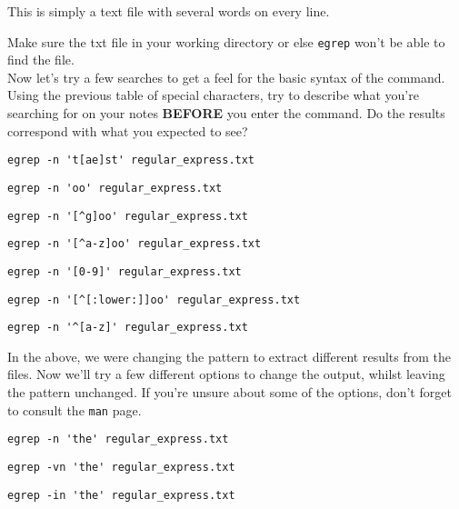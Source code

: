 This is simply a text file with several words on every line. \\

\begin{steps}
Make sure the txt file in your working directory  or else \texttt{egrep} won't be able to find the file. \\

Now let's try a few searches to get a feel for the basic syntax of the command.
Using the previous table of special characters, try to describe what you're searching for on your notes \textbf{BEFORE} you enter the command.
Do the results correspond with what you expected to see?

\begin{lstlisting}
egrep -n 't[ae]st' regular_express.txt
\end{lstlisting}
\begin{lstlisting}
egrep -n 'oo' regular_express.txt
\end{lstlisting}
\begin{lstlisting}
egrep -n '[^g]oo' regular_express.txt
\end{lstlisting}
\begin{lstlisting}
egrep -n '[^a-z]oo' regular_express.txt
\end{lstlisting}
\begin{lstlisting}
egrep -n '[0-9]' regular_express.txt
\end{lstlisting}
\begin{lstlisting}
egrep -n '[^[:lower:]]oo' regular_express.txt
\end{lstlisting}
\begin{lstlisting}
egrep -n '^[a-z]' regular_express.txt
\end{lstlisting}
\end{steps}

\begin{steps}
In the above, we were changing the pattern to extract different results from the files.
Now we'll try a few different options to change the output, whilst leaving the pattern unchanged.
If you're unsure about some of the options, don't forget to consult the \texttt{man} page. \\
\begin{lstlisting}
egrep -n 'the' regular_express.txt
\end{lstlisting}
\begin{lstlisting}
egrep -vn 'the' regular_express.txt
\end{lstlisting}
\begin{lstlisting}
egrep -in 'the' regular_express.txt
\end{lstlisting}
\end{steps}

